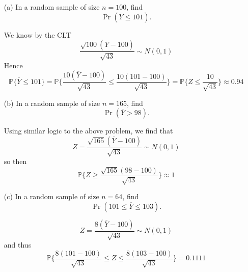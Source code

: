 \documentclass[11pt]{article}
\newcommand{\bbP}{\mathbb{P}}
\begin{document}
\begin{enumerate}
    \item[(a)] In a random sample of size $n = 100$, find 
    \[
    \Pr\left(\overline{Y} \leq 101\right).
    \]
\begin{solution}
    We know by the CLT
    \[\frac{\sqrt{100}(\overline{Y} - 100)}{\sqrt{43}} \sim N(0,1)\] Hence 
    \[\bbP\{\overline{Y} \leq 101\} = \bbP\{\frac{10(\overline{Y} - 100)}{\sqrt{43}} \leq\frac{10(101 - 100)}{\sqrt{43}}\} = \bbP\{Z \leq \frac{10}{\sqrt{43}}\} \approx \boxed{0.94}\]
\end{solution}

    \item[(b)] In a random sample of size $n = 165$, find 
    \[
    \Pr\left(\overline{Y} > 98\right).
    \]
\begin{solution}
    Using similar logic to the above problem, we find that 
    \[Z = \frac{\sqrt{165}(\overline{Y} - 100)}{\sqrt{43}} \sim N(0,1)\] so then 
    \[\bbP\{Z \geq  \frac{\sqrt{165}(98 - 100)}{\sqrt{43}}\}\approx \boxed{1}\]

\end{solution}

    \item[(c)] In a random sample of size $n = 64$, find 
    \[
    \Pr\left(101 \leq \overline{Y} \leq 103\right).
    \]
    \begin{solution}
\[Z = \frac{8(\overline{Y} - 100)}{\sqrt{43}}\sim N(0,1)\] and thus 
\[\bbP\{\frac{8(101 - 100)}{\sqrt{43}} \leq Z \leq \frac{8(103 - 100)}{\sqrt{43}}\}
 = \boxed{0.1111}\]
    \end{solution}
\end{enumerate}


\newpage
\end{document}
